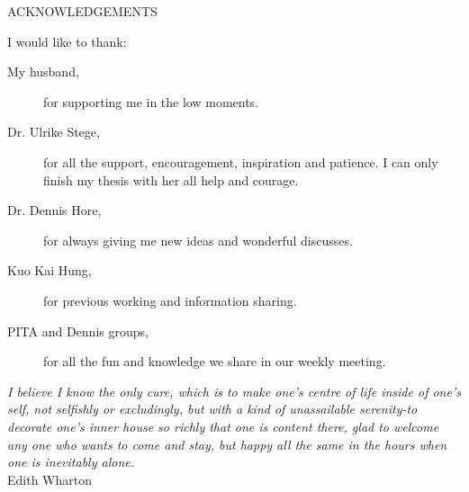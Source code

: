 \newpage
{}

\begin{center}
ACKNOWLEDGEMENTS
\end{center}

\noindent I would like to thank:
\begin{description}
\item[My husband,]
	for supporting me in the low moments.
\item[Dr. Ulrike Stege,]
	for  all the support, encouragement, inspiration and patience. I can only finish my thesis with her all help and courage.
\item[Dr. Dennis Hore,]
	for always giving me new ideas and wonderful discusses.
\item[Kuo Kai Hung, ]
	for previous working and information sharing.
\item[PITA and Dennis groups,]
	for all the fun and knowledge we share in our weekly meeting.
\end{description}

\begin{flushright}
\textit{I believe I know the only cure, which is to make
one's centre of life inside of one's self, not
selfishly or excludingly, but with a kind of
unassailable serenity-to decorate one's inner house
so richly that one is content there, glad to welcome
any one who wants to come and stay, but happy all
the same in the hours when one is inevitably alone.}
\\
Edith Wharton \\
\end{flushright}
